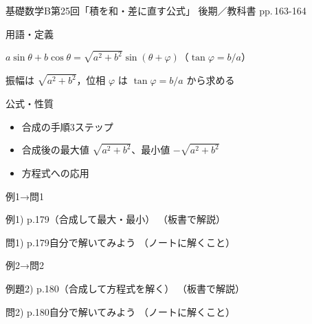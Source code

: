 \documentclass[aspectratio=43,professionalfonts,handout]{beamer}
\newcommand{\LectureNum}{25}
\newcommand{\LectureTitle}{積を和・差に直す公式}
\newcommand{\TextPages}{pp.\,163-164}
\newcommand{\CourseName}{基礎数学B}
\renewcommand{\TermName}{後期}
\begin{document}
\begin{frame}{\CourseName\quad 第\LectureNum 回「\LectureTitle 」}
  {\small \TermName\quad \TeacherName\quad ／\quad 教科書 \TextPages}

  \begin{block}{用語・定義}
  \begin{description}[labelwidth=5.5em]
    \item[\kw{合成：$a\sin\theta + b\cos\theta = \sqrt{a^2+b^2}\sin(\theta+\varphi)$}]
      $a\sin\theta + b\cos\theta = \sqrt{a^2+b^2}\sin(\theta+\varphi)$（$\tan\varphi = b/a$）
    \item[\kw{$\tan\varphi = b/a$ で位相 $\varphi$ を求める}]
      振幅は $\sqrt{a^2+b^2}$，位相 $\varphi$ は $\tan\varphi = b/a$ から求める
  \end{description}
  \end{block}
\end{frame}

\begin{frame}{公式・性質}
  \begin{block}{}
  \begin{itemize}
    \item 合成の手順3ステップ
    \item 合成後の最大値 $\sqrt{a^2+b^2}$、最小値 $-\sqrt{a^2+b^2}$
    \item 方程式への応用
  \end{itemize}
  \end{block}
\end{frame}

\begin{frame}{例1→問1}
  \begin{exampleblock}{例1) p.179（合成して最大・最小）}
    （板書で解説）
  \end{exampleblock}

  \vfill

  \begin{block}{問1) p.179\quad 自分で解いてみよう}
    （ノートに解くこと）
  \end{block}
\end{frame}

\begin{frame}{例2→問2}
  \begin{exampleblock}{例題2) p.180（合成して方程式を解く）}
    （板書で解説）
  \end{exampleblock}

  \vfill

  \begin{block}{問2) p.180\quad 自分で解いてみよう}
    （ノートに解くこと）
  \end{block}
\end{frame}
\end{document}
